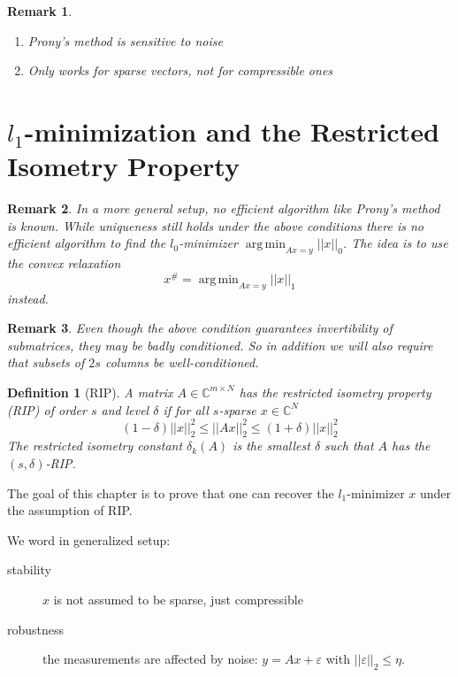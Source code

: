 \documentclass[10pt,a4paper]{article}
\theoremstyle{thmstyle}
\newtheorem{definition}{Definition}
\newtheorem{remark}{Remark}
\DeclareMathOperator{\argmin}{arg\,min}
\begin{document}
\begin{remark}
  \begin{enumerate}
  \item Prony's method is sensitive to noise
  \item Only works for sparse vectors, not for compressible ones
  \end{enumerate}
\end{remark}

\section{$l_{1}$-minimization and the Restricted Isometry Property}

\begin{remark}
  In a more general setup, no efficient algorithm like Prony's method is known.
  While uniqueness still holds under the above conditions there is no efficient algorithm to find the $l_{0}$-minimizer $\argmin_{Ax = y} ||x||_{0}$.
  The idea is to use the convex relaxation
  \begin{equation}
    x^{\#} = \argmin_{Ax = y} ||x||_{1} \label{eq:P1}
  \end{equation}
  instead.
\end{remark}

\begin{remark}
  Even though the above condition guarantees invertibility of submatrices, they may be badly conditioned.
  So in addition we will also require that subsets of $2s$ columns be well-conditioned.
\end{remark}

\begin{definition}[RIP]
  A matrix $A \in \mathbb{C}^{m \times N}$ has the \emph{restricted isometry property} (RIP) of order $s$ and level $\delta$ if for all $s$-sparse $x \in \mathbb{C}^{N}$
  \begin{equation*}
    (1 - \delta) ||x||_{2}^{2} \le ||Ax||_{2}^{2} \le (1 + \delta) ||x||_{2}^{2}
  \end{equation*}
  The \emph{restricted isometry constant} $\delta_{k}(A)$ is the smallest $\delta$ such that $A$ has the $(s, \delta)$-RIP.
\end{definition}

The goal of this chapter is to prove that one can recover the $l_{1}$-minimizer $x$ under the assumption of RIP.

We word in generalized setup:

\begin{description}
\item[stability] $x$ is not assumed to be sparse, just compressible
\item[robustness] the measurements are affected by noise: $y = Ax + \varepsilon$ with $||\varepsilon||_{2} \le \eta$.
\end{description}
\end{document}
